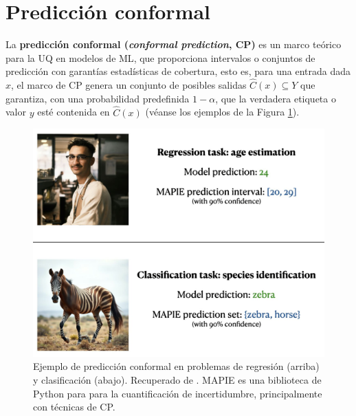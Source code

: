 \section{Predicción conformal}

La \textbf{predicción conformal (\textit{conformal prediction}, \acrshort{CP})} \cite{vovk2005, angelopoulos2021} es un marco teórico para la \acrshort{UQ} en modelos de \acrshort{ML}, que proporciona intervalos o conjuntos de predicción con garantías estadísticas de cobertura, esto es, para una entrada dada $x$, el marco de \acrshort{CP} genera un conjunto de posibles salidas $\hat{C}(x) \subseteq Y$ que garantiza, con una probabilidad predefinida $1-\alpha$, que la verdadera etiqueta o valor $y$ esté contenida en $\hat{C}(x)$ (véanse los ejemplos de la Figura 
\ref{fig:educational_visual}).

\begin{figure}[h]
    \centering
    \includegraphics[width=\textwidth]{capitulos/cap_02/imagenes/educational_visual.png}
    \caption[
        Ejemplo de predicción conformal en problemas de regresión y clasificación.
    ]{
        Ejemplo de predicción conformal en problemas de regresión (arriba) y clasificación (abajo).
        Recuperado de \cite{mapie-docs2023}. MAPIE es una biblioteca de Python para para la cuantificación
        de incertidumbre, principalmente con técnicas de \acrshort{CP}. 
    } 
    \label{fig:educational_visual}
\end{figure}


